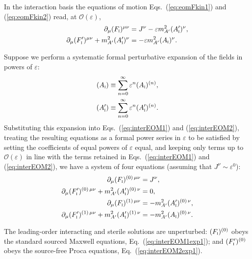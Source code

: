 \documentclass[amsmath,amssymb,aps,10pt,prd,letterpaper,nofootinbib,balancelastpage,notitlepage,superscriptaddress,twocolumn,floatfix]{revtex4-2}
\renewcommand{\eqref}[2][]{Eq{#1}.~(\ref{eq:#2})}	%
\newcommand{\inter}[1]{({#1}_{\textsc{i}})}
\newcommand{\primeinter}[1]{({#1}_{\textsc{i}}^\prime)}
\begin{document}
In the interaction basis the equations of motion \eqref[s]{eomFkin1} and (\ref{eq:eomFkin2}) read, at $\mathcal{O}(\varepsilon)$,
\begin{align}
    \partial_\mu \inter{F}^{\mu\nu} &= J^\nu - \varepsilon m_{A'}^2 \primeinter{A}^\nu, \label{eq:interEOM1} \\
    \partial_\mu \primeinter{F}^{\mu\nu} + m_{A'}^2 \primeinter{A}^\nu &= -\varepsilon m_{A'}^2 \inter{A}^\nu. \label{eq:interEOM2}        
\end{align}

Suppose we perform a systematic formal perturbative expansion of the fields in powers of $\varepsilon$:
\begin{align}
    \inter{A} &\equiv \sum_{n=0}^\infty \varepsilon^n \inter{A}^{(n)},\\
    \primeinter{A} &\equiv \sum_{n=0}^\infty \varepsilon^n \primeinter{A}^{(n)}.
\end{align}
Substituting this expansion into \eqref[s]{interEOM1} and (\ref{eq:interEOM2}), treating the resulting equations as a formal power series in $\varepsilon$ to be satisfied by setting the coefficients of equal powers of $\varepsilon$  equal, and keeping only terms up to $\mathcal{O}(\varepsilon)$ in line with the terms retained in \eqref[s]{interEOM1} and (\ref{eq:interEOM2}), we have a system of four equations (assuming that $J^\nu \sim \varepsilon^0$):
\begin{align}
    \partial_\mu \inter{F}^{(0)\, \mu\nu} &= J^\nu, \label{eq:interEOM1exp1} \\
    \partial_\mu \primeinter{F}^{(0)\, \mu\nu} + m_{A'}^2 \primeinter{A}^{(0)\, \nu} &= 0, \label{eq:interEOM2exp1}   \\
    \partial_\mu \inter{F}^{(1)\, \mu\nu} &= - m_{A'}^2 \primeinter{A}^{(0)\, \nu}, \label{eq:interEOM1exp2} \\
    \partial_\mu \primeinter{F}^{(1)\, \mu\nu} + m_{A'}^2 \primeinter{A}^{(1)\, \nu} &= - m_{A'}^2 \inter{A}^{(0)\, \nu}. \label{eq:interEOM2exp2}   
\end{align}

The leading-order interacting and sterile solutions are unperturbed: $\inter{F}^{(0)}$ obeys the standard sourced Maxwell equations, \eqref{interEOM1exp1}; and $\primeinter{F}^{(0)}$ obeys the source-free Proca equations, \eqref{interEOM2exp1}.
\end{document}
